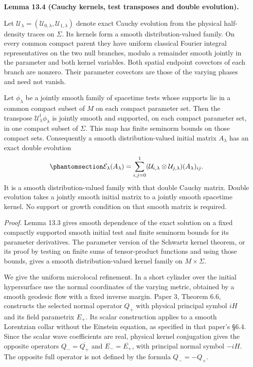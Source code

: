 \documentclass[
  english,
  11pt,
  reqno]{amsart}
\makeatletter
\newcommand{\pandocstatementheading}[1]{%
  \par\if@nobreak\else
    \addpenalty{\@beginparpenalty}%
    \addvspace{.5\baselineskip plus .2\baselineskip minus .2\baselineskip}%
  \fi
  {\normalfont\bfseries #1\par}%
  \nobreak\@afterindenttrue\@afterheading
}
\makeatother
\begin{document}
\pandocstatementheading{\protect{}\label{lem:family-cauchy-kernels}Lemma 13.4 (Cauchy kernels, test transposes and double evolution).}

Let
\(\mathcal U_\lambda=(\mathcal U_{0,\lambda},\mathcal U_{1,\lambda})\)
denote exact Cauchy evolution from the physical half-density traces on
\(\Sigma\). Its kernels form a smooth distribution-valued family. On
every common compact parent they have uniform classical Fourier integral
representatives on the two null branches, modulo a remainder smooth
jointly in the parameter and both kernel variables. Both spatial
endpoint covectors of each branch are nonzero. Their parameter covectors
are those of the varying phases and need not vanish.

Let \(\phi_\lambda\) be a jointly smooth family of spacetime tests whose
supports lie in a common compact subset of \(M\) on each compact
parameter set. Then the transpose \(\mathcal U_\lambda^t\phi_\lambda\)
is jointly smooth and supported, on each compact parameter set, in one
compact subset of \(\Sigma\). This map has finite seminorm bounds on
those compact sets. Consequently a smooth distribution-valued initial
matrix \(A_\lambda\) has an exact double evolution
\begin{equation}\protect\phantomsection\label{eq:family-double-cauchy-evolution}{
\mathcal E_\lambda(A_\lambda)
=\sum_{i,j=0}^1
 (\mathcal U_{i,\lambda}\otimes\mathcal U_{j,\lambda})
 (A_\lambda)_{ij}.
}\end{equation} It is a smooth distribution-valued family with that
double Cauchy matrix. Double evolution takes a jointly smooth initial
matrix to a jointly smooth spacetime kernel. No support or growth
condition on that smooth matrix is required.

\emph{Proof.} Lemma 13.3 gives smooth dependence of the exact solution
on a fixed compactly supported smooth initial test and finite seminorm
bounds for its parameter derivatives. The parameter version of the
Schwartz kernel theorem, or its proof by testing on finite sums of
tensor-product functions and using those bounds, gives a smooth
distribution-valued kernel family on \(M\times\Sigma\).

We give the uniform microlocal refinement. In a short cylinder over the
initial hypersurface use the normal coordinates of the varying metric,
obtained by a smooth geodesic flow with a fixed inverse margin. Paper 3,
Theorem 6.6, constructs the selected normal operator \(Q_+\) with
physical principal symbol \(iH\) and its field parametrix \(E_+\). Its
scalar construction applies to a smooth Lorentzian collar without the
Einstein equation, as specified in that paper's §6.4. Since the scalar
wave coefficients are real, physical kernel conjugation gives the
opposite operators \(Q_-=\overline{Q_+}\) and \(E_-=\overline{E_+}\),
with principal normal symbol \(-iH\). The opposite full operator is not
defined by the formula \(Q_-=-Q_+\).
\end{document}
